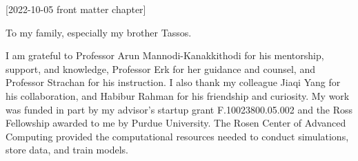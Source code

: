 [2022-10-05 front matter chapter]
%
%
%
%
%
%

%
%
%
\begin{statement}
\end{statement}

\begin{dedication}
  To my family, especially my brother Tassos.
\end{dedication}

\begin{acknowledgments}
  I am grateful to
  Professor Arun Mannodi-Kanakkithodi for his mentorship, support, and knowledge,
  Professor Erk for her guidance and counsel, and
  Professor Strachan for his instruction.
  I also thank
  my colleague Jiaqi Yang for his collaboration, and
  Habibur Rahman for his friendship and curiosity.
  My work was funded in part by my advisor's startup grant F.10023800.05.002 and the Ross Fellowship awarded to me by Purdue University.
  The Rosen Center of Advanced Computing provided the computational
  resources needed to conduct simulations, store data, and train models.
\end{acknowledgments}


